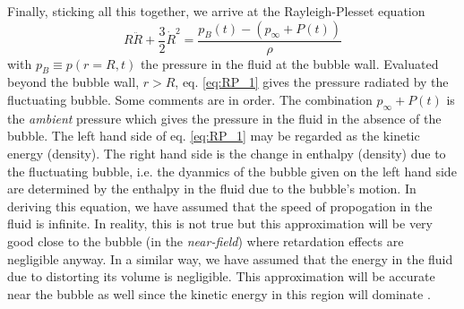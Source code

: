 \documentclass[rmp,aps,nofootinbib,superscriptaddress,floatfix,10pt]{revtex4-2}
\begin{document}
Finally, sticking all this together, we arrive at the Rayleigh-Plesset equation \cite{prosperetti1999old,prosperetti1986bubble,leighton2007derivation,plesset1949dynamics,plesset1977bubble}
\begin{equation}
    R\ddot{R}+\frac{3}{2}\dot{R}^2 = \frac{p_B(t)-(p_\infty+P(t))}{\rho}
    \label{eq:RP_1}
\end{equation}
with $p_B \equiv p(r=R,t)$ the pressure in the fluid at the bubble wall. Evaluated beyond the bubble wall, $r > R$, eq. \ref{eq:RP_1} gives the pressure radiated by the fluctuating bubble. Some comments are in order. The combination $p_\infty+P(t)$ is the \emph{ambient} pressure \cite{prosperetti1999old,prosperetti1986bubble} which gives the pressure in the fluid in the absence of the bubble. The left hand side of eq. \ref{eq:RP_1} may be regarded as the kinetic energy (density). The right hand side is the change in enthalpy (density) due to the fluctuating bubble, i.e. the dyanmics of the bubble given on the left hand side are determined by the enthalpy in the fluid due to the bubble's motion. In deriving this equation, we have assumed that the speed of propogation in the fluid is infinite. In reality, this is not true but this approximation will be very good close to the bubble (in the \emph{near-field}) where retardation effects are negligible anyway. In a similar way, we have assumed that the energy in the fluid due to distorting its volume is negligible. This approximation will be accurate near the bubble as well since the kinetic energy in this region will dominate \cite{prosperetti1999old}. 
\end{document}
